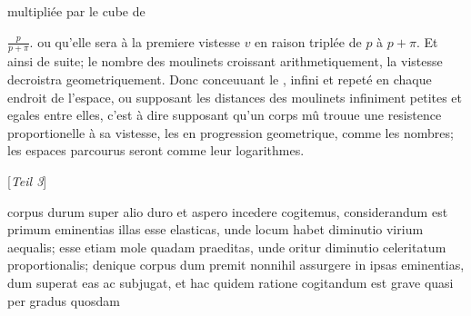 multipli\'{e}e par le cube de \rule[-4mm]{0mm}{10mm}$\displaystyle \frac{p}{p + \pi}$. ou qu'elle sera \`{a} la premiere vistesse 
$\displaystyle v$ en raison tripl\'{e}e de $\displaystyle p$ \`{a} $\displaystyle p + \pi$. Et ainsi de suite; le nombre des moulinets croissant arithmetiquement, la vistesse decroistra geometriquement. Donc conceuuant le
,
infini et repet\'{e} en chaque endroit de l'espace, ou supposant les distances des moulinets infiniment petites et egales entre elles, c'est \`{a} dire supposant qu'un corps mû trouue une resistence\protect{} proportionelle \`{a} sa vistesse, les
en progression geometrique, 
comme les nombres; les espaces parcourus\protect{} seront comme leur logarithmes.
\pend
\vspace{0.8em}
\count{}
\count{}
\pstart
\begin{center}
[\textit{Teil 3}]
\end{center}
\pend
\vspace{0.4em}
\pstart
\noindent{}
corpus durum super alio duro et aspero incedere cogitemus, considerandum est primum eminentias illas esse elasticas, unde locum habet diminutio virium\protect{} aequalis; esse etiam mole quadam praeditas, unde oritur diminutio celeritatum\protect{} proportionalis; denique corpus dum premit nonnihil assurgere in ipsas eminentias, dum superat eas ac subjugat, et hac quidem ratione cogitandum est grave quasi per gradus quosdam
